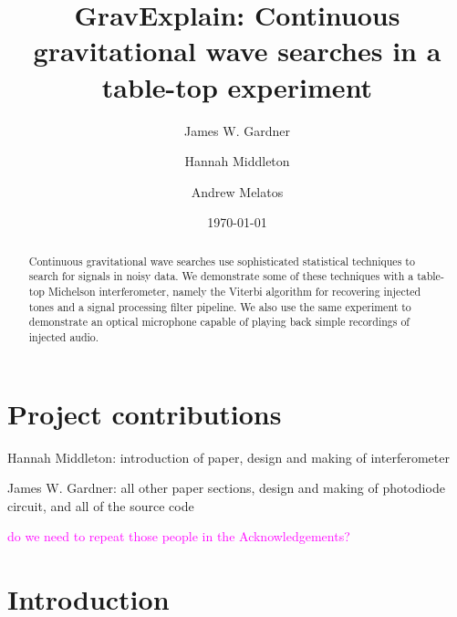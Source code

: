 \documentclass[prb,preprint]{revtex4-1}
\newcommand{\jam}{\textcolor{magenta}}
\begin{document}
\section*{Project contributions}
Hannah Middleton: introduction of paper, design and making of interferometer


James W. Gardner: all other paper sections, design and making of photodiode circuit, and all of the source code


\jam{do we need to repeat those people in the Acknowledgements?}

\newpage

\title{GravExplain: Continuous gravitational wave searches in a table-top experiment}

\author{James W. Gardner}

\author{Hannah Middleton}
\author{Andrew Melatos}

\date{\today}

\begin{abstract}
Continuous gravitational wave searches use sophisticated statistical techniques to search for signals in noisy data. We demonstrate some of these techniques with a table-top Michelson interferometer, namely the Viterbi algorithm for recovering injected tones and a signal processing filter pipeline. We also use the same experiment to demonstrate an optical microphone capable of playing back simple recordings of injected audio.
 
\end{abstract}

\maketitle


\section{Introduction}
\end{document}
